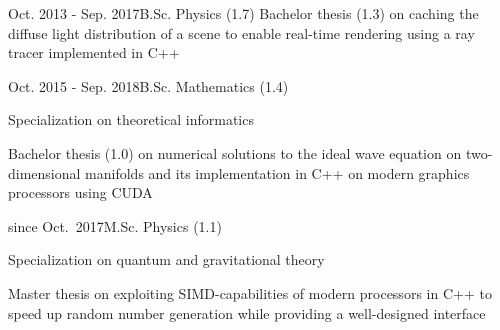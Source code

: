\documentclass[a4paper,10pt]{cv}
\begin{document}
      \begin{cvTimeItem}{Oct. 2013 - Sep. 2017}{B.Sc. Physics (1.7)}
        Bachelor thesis  (1.3) on caching the diffuse light distribution of a scene to enable real-time rendering using a ray tracer implemented in C++
      \end{cvTimeItem}
      \begin{cvTimeItem}{Oct. 2015 - Sep. 2018}{B.Sc. Mathematics (1.4)}
        \begin{cvItemize}
          \item Specialization on theoretical informatics
          \item Bachelor thesis  (1.0) on numerical solutions to the ideal wave equation on two-dimensional manifolds and its implementation in C++ on modern graphics processors using CUDA
        \end{cvItemize}
      \end{cvTimeItem}
      \begin{cvTimeItem}{since Oct.~2017}{M.Sc. Physics (1.1)}
        \begin{cvItemize}
          \item Specialization on quantum and gravitational theory
          \item Master thesis  on exploiting SIMD-capabilities of modern processors in C++ to speed up random number generation while providing a well-designed interface
        \end{cvItemize}
      \end{cvTimeItem}
\end{document}
